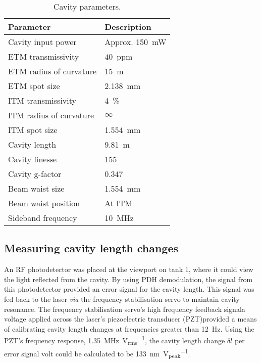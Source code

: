 \begin{table}
  \centering
  \begin{tabular}{|l|l|}
    \hline
    \textbf{Parameter}        & \textbf{Description}	      \\ \hline
    Cavity input power      & Approx. \SI{150}{\milli\watt}   \\ \hline
    \gls{ETM} transmissivity      & $40$~ppm                  \\ \hline
    \gls{ETM} radius of curvature & \SI{15}{\meter}           \\ \hline
    \gls{ETM} spot size           & \SI{2.138}{\milli \meter} \\ \hline
    \gls{ITM} transmissivity      & \SI{4}{\%}                \\ \hline
    \gls{ITM} radius of curvature & $\infty$                  \\ \hline
    \gls{ITM} spot size           & \SI{1.554}{\milli \meter} \\ \hline
    Cavity length           & \SI{9.81}{\meter}               \\ \hline
    Cavity finesse          & \SI{155}{}                      \\ \hline
    Cavity g-factor         & \SI{0.347}{}                    \\ \hline
    Beam waist size         & \SI{1.554}{\milli \meter}       \\ \hline
    Beam waist position     & At \gls{ITM}                    \\ \hline
    Sideband frequency      & \SI{10}{\mega\hertz}            \\ \hline
  \end{tabular}
  \caption{\label{tab:cavity-parameters}Cavity parameters.}
\end{table}

\subsection{\label{sec:cavity-length-measurement}Measuring cavity length changes}

An RF photodetector was placed at the viewport on tank 1, where it could view the light reflected from the cavity. By using \gls{PDH} demodulation, the signal from this photodetector provided an error signal for the cavity length. This signal was fed back to the laser \emph{via} the frequency stabilisation servo to maintain cavity resonance. The frequency stabilisation servo's high frequency feedback signal\textemdash a voltage applied across the laser's piezoelectric transducer (\gls{PZT})\textemdash provided a means of calibrating cavity length changes at frequencies greater than \SI{12}{\hertz}. Using the \gls{PZT}'s frequency response, \SI{1.35}{\mega\hertz \per \volt_{rms}}, the cavity length change $\delta l$ per error signal volt could be calculated to be \SI{133}{\nano\meter \per \volt_{peak}}.

